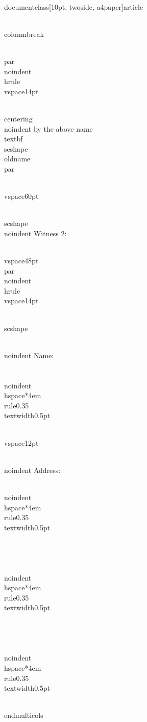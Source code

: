 \\documentclass[10pt, twoside, a4paper]{article}
\begin{document}
	\\columnbreak

	\\par\\noindent\\hrule
	\\vspace{14pt}

	{
		\\centering
		\\noindent
		by the above name \\textbf{\\scshape{\\oldname}}
		\\par
	}

	\\vspace{60pt}

	{\\scshape \\noindent Witness 2:}

	\\vspace{48pt}
	\\par\\noindent\\hrule
	\\vspace{14pt}

	{
		\\scshape

		\\noindent Name: \\\\
		\\noindent\\hspace*{4em}\\rule{0.35\\textwidth}{0.5pt}

		\\vspace{12pt}

		\\noindent Address:

		\\noindent\\hspace*{4em}\\rule{0.35\\textwidth}{0.5pt} \\\\ \\\\
		\\noindent\\hspace*{4em}\\rule{0.35\\textwidth}{0.5pt} \\\\ \\\\
		\\noindent\\hspace*{4em}\\rule{0.35\\textwidth}{0.5pt}
	}

\\end{multicols}

\
\end{document}
